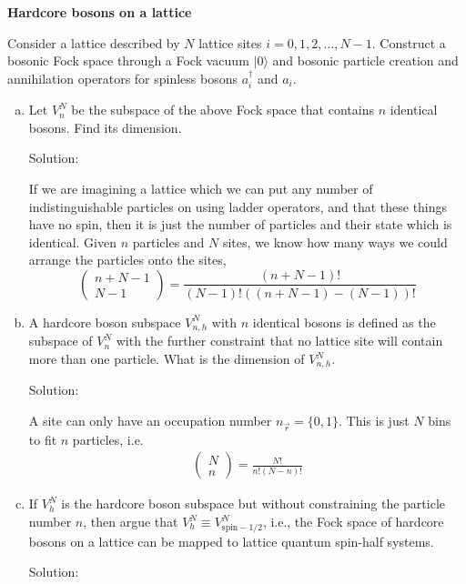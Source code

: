 \begin{homeworkProblem}
\textbf{Hardcore bosons on a lattice}

Consider a lattice described by $N$ lattice sites $i = 0, 1, 2, \ldots, N-1$. Construct a bosonic Fock space through a Fock vacuum $|0\rangle$ and bosonic particle creation and annihilation operators for spinless bosons $a_i^{\dagger}$ and $a_i$.

\begin{enumerate}[a.]
    \item Let $V^{N}_{n}$ be the subspace of the above Fock space that contains $n$ identical bosons. Find its dimension.
        \begin{callout}{Solution:}

            If we are imagining a lattice which we can put any number of indistinguishable particles on using ladder operators, and that these things have no spin, then it is just the number of particles and their state which is identical. Given $n$ particles and $N$ sites, we know how many ways we could arrange the particles onto the sites,
            $$\begin{pmatrix} n+N-1 \\ N-1 \end{pmatrix} = \frac{(n+N-1)!}{(N-1)!((n+N-1)-(N-1))!}$$

        \end{callout}
    
        
    \item A hardcore boson subspace $V^{N}_{n,h}$ with $n$ identical bosons is defined as the subspace of $V^{N}_{n}$ with the further constraint that no lattice site will contain more than one particle. What is the dimension of $V^{N}_{n,h}$.
        \begin{callout}{Solution:}

            A site can only have an occupation number $n_{\vec{r}}=\{0,1\}$. This is just $N$ bins to fit $n$ particles, i.e. 
            \begin{align*}
               \begin{pmatrix} N \\ n \end{pmatrix} = \frac{N!}{n!(N-n)!}
            \end{align*}

        \end{callout}
    
    \item If $V^{N}_{h}$ is the hardcore boson subspace but without constraining the particle number $n$, then argue that $V^{N}_{h} \equiv V^{N}_{\mathrm{spin-1/2}}$, i.e., the Fock space of hardcore bosons on a lattice can be mapped to lattice quantum spin-half systems.
        \begin{callout}{Solution:}


\end{callout}
\end{enumerate}
\end{homeworkProblem}

